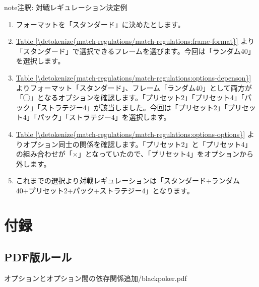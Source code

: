 \documentclass[letterpaper,10pt,dvipdfmx]{sphinxmanual}
\begin{document}
\begin{sphinxadmonition}{note}{注釈:}
\sphinxAtStartPar
対戦レギュレーション決定例
\begin{enumerate}
%
\item {} 
\sphinxAtStartPar
フォーマットを「スタンダード」に決めたとします。

\item {} 
\sphinxAtStartPar
\hyperref[\detokenize{match-regulations/match-regulations:frame-format}]{Table \ref{\detokenize{match-regulations/match-regulations:frame-format}}} より「スタンダード」で選択できるフレームを選びます。今回は「ランダム40」を選択します。

\item {} 
\sphinxAtStartPar
\hyperref[\detokenize{match-regulations/match-regulations:options-depenson}]{Table \ref{\detokenize{match-regulations/match-regulations:options-depenson}}} よりフォーマット「スタンダード」、フレーム「ランダム40」として両方が「◯」となるオプションを確認します。「プリセット2」「プリセット4」「パック」「ストラテジー4」が該当しました。今回は「プリセット2」「プリセット4」「パック」「ストラテジー4」を選択します。

\item {} 
\sphinxAtStartPar
\hyperref[\detokenize{match-regulations/match-regulations:options-options}]{Table \ref{\detokenize{match-regulations/match-regulations:options-options}}} よりオプション同士の関係を確認します。「プリセット2」と「プリセット4」の組み合わせが「×」となっていたので、「プリセット4」をオプションから外します。

\item {} 
\sphinxAtStartPar
これまでの選択より対戦レギュレーションは「スタンダード+ランダム40+プリセット2+パック+ストラテジー4」となります。

\end{enumerate}
\end{sphinxadmonition}

\sphinxstepscope


\chapter{付録}
\label{\detokenize{appendix/appendix:appendix-rst}}\label{\detokenize{appendix/appendix:id1}}\label{\detokenize{appendix/appendix::doc}}

\section{PDF版ルール}
\label{\detokenize{appendix/appendix:pdf}}
\sphinxAtStartPar
{}\sphinxhyphen{}オプションとオプション間の依存関係追加/blackpoker.pdf
\end{document}
